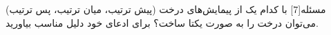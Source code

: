 
‌مسئله[7]
با کدام یک از پیمایش‌های درخت (پیش ترتیب، میان ترتیب، پس ترتیب) می‌توان درخت را به صورت یکتا ساخت؟
برای ادعای خود دلیل مناسب بیاورید.













